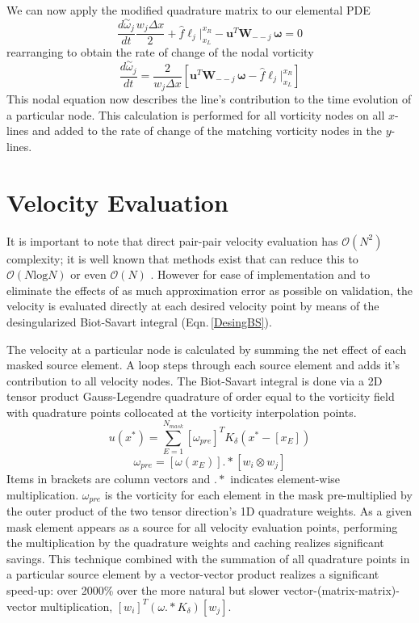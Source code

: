 \documentclass[letterpaper,12pt]{report}
\newcommand{\be}{\begin{equation}}
\newcommand{\ben}[1]{\begin{equation}\label{#1}}
\newcommand{\ee}{\end{equation}}
\newcommand{\aomega}{\overset{\sim}{\omega}}				%
\begin{document}
We can now apply the modified quadrature matrix to our elemental PDE
\ben{DGJoshTemp3} \frac{d \aomega_j}{dt} \frac{w_j \Delta x}{2}
+\hat{f}\ell_j \Big|^{x_R}_{x_L} 
- \mathbf{u}^T \mathbf{W}_{--j} \, \boldsymbol{\omega} = 0 \ee
rearranging to obtain the rate of change of the nodal vorticity
\ben{DGJosh} \frac{d \aomega_j}{dt}
=\frac{2}{w_j \Delta x} \left[\mathbf{u}^T \mathbf{W}_{--j} \, \boldsymbol{\omega} - \hat{f}\ell_j \Big|^{x_R}_{x_L}\right]  \ee
This nodal equation now describes the line's contribution to the time evolution of a particular node. This calculation is performed for all vorticity nodes on all $x$-lines and added to the rate of change of the matching vorticity nodes in the $y$-lines.

%
\section{Velocity Evaluation}\label{VelEval}
It is important to note that direct pair-pair velocity evaluation has $\mathcal{O}(N^2)$ complexity; it is well known that methods exist that can reduce this to $\mathcal{O}(N\text{log}N)$ or even $\mathcal{O}(N)$ \cite{SchumannSweet1976,LindsayKrasny2001,BarnesHut1986,GreengardRokhlin1987}. However for ease of implementation and to eliminate the effects of as much approximation error as possible on validation, the velocity is evaluated directly at each desired velocity point by means of the desingularized Biot-Savart integral (Eqn.\,\eqref{DesingBS}). 

The velocity at a particular node is calculated by summing the net effect of each masked source element. A loop steps through each source element and adds it's contribution to all velocity nodes. The Biot-Savart integral is done via a 2D tensor product Gauss-Legendre quadrature of order equal to the vorticity field with quadrature points collocated at the vorticity interpolation points. 
\be u(x^*)= \sum_{E=1}^{N_{mask}} [\omega_{pre}]^TK_{\delta}(x^*-[x_E]) \ee
\be \omega_{pre} = [\omega(x_E)].*[w_i \otimes w_j]\ee
Items in brackets are column vectors and $.*$ indicates element-wise multiplication. $\omega_{pre}$ is the vorticity for each element in the mask pre-multiplied by the outer product of the two tensor direction's 1D quadrature weights. As a given mask element appears as a source for all velocity evaluation points, performing the multiplication by the quadrature weights and caching realizes significant savings. This technique combined with the summation of all quadrature points in a  particular source element by a vector-vector product realizes a significant speed-up: over 2000\% over the more natural but slower vector-(matrix-matrix)-vector multiplication, $[w_i]^T(\omega.*K_{\delta})[w_j]$.
\end{document}
